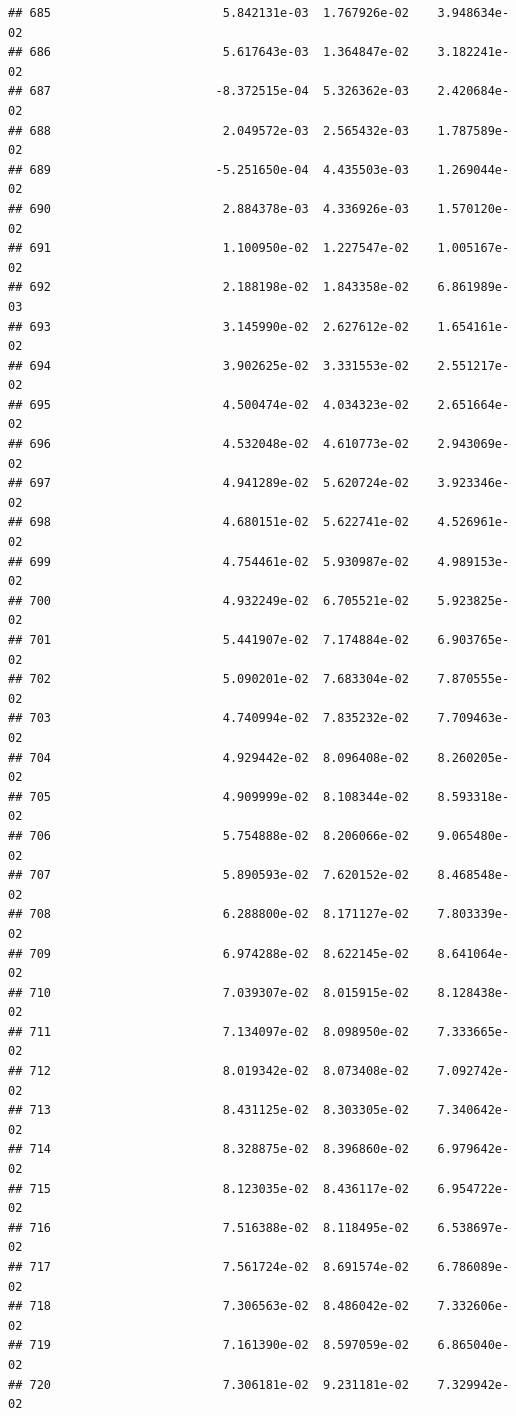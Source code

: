 \documentclass[
]{article}
\begin{document}
\begin{verbatim}
## 685                        5.842131e-03  1.767926e-02    3.948634e-02
## 686                        5.617643e-03  1.364847e-02    3.182241e-02
## 687                       -8.372515e-04  5.326362e-03    2.420684e-02
## 688                        2.049572e-03  2.565432e-03    1.787589e-02
## 689                       -5.251650e-04  4.435503e-03    1.269044e-02
## 690                        2.884378e-03  4.336926e-03    1.570120e-02
## 691                        1.100950e-02  1.227547e-02    1.005167e-02
## 692                        2.188198e-02  1.843358e-02    6.861989e-03
## 693                        3.145990e-02  2.627612e-02    1.654161e-02
## 694                        3.902625e-02  3.331553e-02    2.551217e-02
## 695                        4.500474e-02  4.034323e-02    2.651664e-02
## 696                        4.532048e-02  4.610773e-02    2.943069e-02
## 697                        4.941289e-02  5.620724e-02    3.923346e-02
## 698                        4.680151e-02  5.622741e-02    4.526961e-02
## 699                        4.754461e-02  5.930987e-02    4.989153e-02
## 700                        4.932249e-02  6.705521e-02    5.923825e-02
## 701                        5.441907e-02  7.174884e-02    6.903765e-02
## 702                        5.090201e-02  7.683304e-02    7.870555e-02
## 703                        4.740994e-02  7.835232e-02    7.709463e-02
## 704                        4.929442e-02  8.096408e-02    8.260205e-02
## 705                        4.909999e-02  8.108344e-02    8.593318e-02
## 706                        5.754888e-02  8.206066e-02    9.065480e-02
## 707                        5.890593e-02  7.620152e-02    8.468548e-02
## 708                        6.288800e-02  8.171127e-02    7.803339e-02
## 709                        6.974288e-02  8.622145e-02    8.641064e-02
## 710                        7.039307e-02  8.015915e-02    8.128438e-02
## 711                        7.134097e-02  8.098950e-02    7.333665e-02
## 712                        8.019342e-02  8.073408e-02    7.092742e-02
## 713                        8.431125e-02  8.303305e-02    7.340642e-02
## 714                        8.328875e-02  8.396860e-02    6.979642e-02
## 715                        8.123035e-02  8.436117e-02    6.954722e-02
## 716                        7.516388e-02  8.118495e-02    6.538697e-02
## 717                        7.561724e-02  8.691574e-02    6.786089e-02
## 718                        7.306563e-02  8.486042e-02    7.332606e-02
## 719                        7.161390e-02  8.597059e-02    6.865040e-02
## 720                        7.306181e-02  9.231181e-02    7.329942e-02

\end{verbatim}
\end{document}
